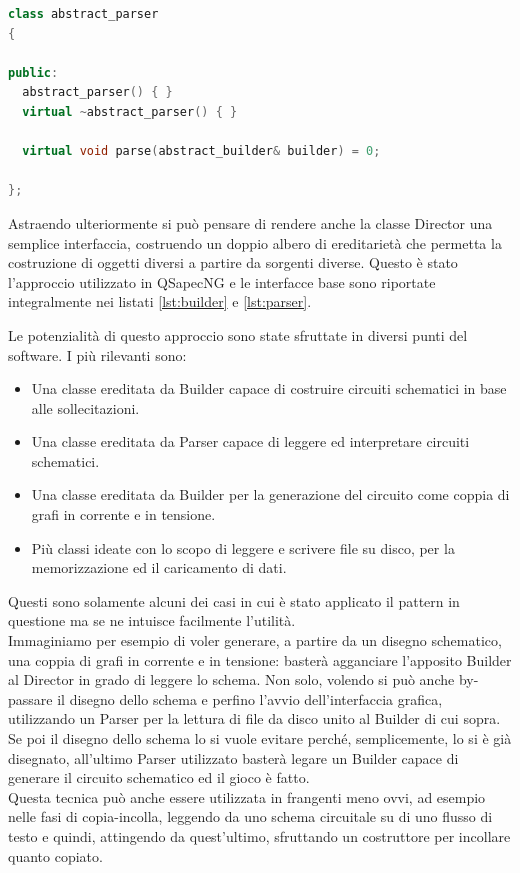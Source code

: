 \begin{lstlisting}[basicstyle=\small,language=C++,caption={Director in QSapecNG},float,label={lst:parser},captionpos=b,frame=lines]
class abstract_parser
{

public:
  abstract_parser() { }
  virtual ~abstract_parser() { }

  virtual void parse(abstract_builder& builder) = 0;

};
\end{lstlisting}

Astraendo ulteriormente si può pensare di rendere anche la classe Director una semplice interfaccia, costruendo un doppio albero di ereditarietà che permetta la costruzione di oggetti diversi a partire da sorgenti diverse. Questo è stato l'approccio utilizzato in QSapecNG e le interfacce base sono riportate integralmente nei listati \ref{lst:builder} e \ref{lst:parser}.

Le potenzialità di questo approccio sono state sfruttate in diversi punti del software. I più rilevanti sono:
\begin{itemize}
 \item Una classe ereditata da Builder capace di costruire circuiti schematici in base alle sollecitazioni.
 \item Una classe ereditata da Parser capace di leggere ed interpretare circuiti schematici.
 \item Una classe ereditata da Builder per la generazione del circuito come coppia di grafi in corrente e in tensione.
 \item Più classi ideate con lo scopo di leggere e scrivere file su disco, per la memorizzazione ed il caricamento di dati.
\end{itemize}
Questi sono solamente alcuni dei casi in cui è stato applicato il pattern in questione ma se ne intuisce facilmente l'utilità.\\
Immaginiamo per esempio di voler generare, a partire da un disegno schematico, una coppia di grafi in corrente e in tensione: basterà agganciare l'apposito Builder al Director in grado di leggere lo schema. Non solo, volendo si può anche by-passare il disegno dello schema e perfino l'avvio dell'interfaccia grafica, utilizzando un Parser per la lettura di file da disco unito al Builder di cui sopra. Se poi il disegno dello schema lo si vuole evitare perché, semplicemente, lo si è già disegnato, all'ultimo Parser utilizzato basterà legare un Builder capace di generare il circuito schematico ed il gioco è fatto.\\
Questa tecnica può anche essere utilizzata in frangenti meno ovvi, ad esempio nelle fasi di copia-incolla, leggendo da uno schema circuitale su di uno flusso di testo e quindi, attingendo da quest'ultimo, sfruttando un costruttore per incollare quanto copiato.

